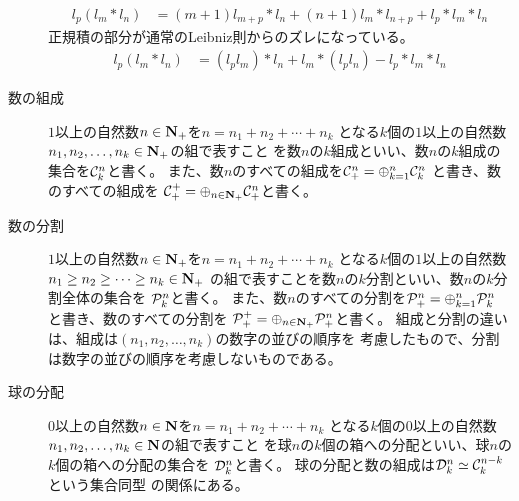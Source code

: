 \begin{description}
\begin{equation}
\begin{split}
			l_p(l_m*l_n) &= (m+1)l_{m+p}*l_n + (n+1)l_m*l_{n+p} + l_p*l_m*l_n
		\end{split}\end{equation} %
		正規積の部分が通常のLeibniz則からのズレになっている。
		\begin{equation*}\begin{split} %
			l_p(l_m*l_n) &= (l_pl_m)*l_n + l_m*(l_pl_n) - l_p*l_m*l_n
		\end{split}\end{equation*} %
		\item[数の組成] $1$以上の自然数$n\in{\ensuremath{\mathbf{N}}}_+$を$n=n_1+n_2+\cdots+n_k$
		となる$k$個の$1$以上の自然数$n_1,n_2,\dots,n_k\in{\ensuremath{\mathbf{N}}}_+$の組で表すこと
		を数$n$の$k$組成といい、数$n$の$k$組成の集合を${\mathcal{C}}_k^n$と書く。
		また、数$n$のすべての組成を${\mathcal{C}}_+^n=\oplus_{k=1}^n{\mathcal{C}}_k^n$
		と書き、数のすべての組成を
		${\mathcal{C}}_+^+=\oplus_{n\in{\ensuremath{\mathbf{N}}}_+}{\mathcal{C}}_+^n$と書く。
		\item[数の分割] $1$以上の自然数$n\in{\ensuremath{\mathbf{N}}}_+$を$n=n_1+n_2+\cdots+n_k$
		となる$k$個の$1$以上の自然数$n_1\ge n_2\ge\cdots\ge n_k\in{\ensuremath{\mathbf{N}}}_+$
		の組で表すことを数$n$の$k$分割といい、数$n$の$k$分割全体の集合を
		${\mathcal{P}}_k^n$と書く。
		また、数$n$のすべての分割を${\mathcal{P}}_+^n=\oplus_{k=1}^n{\mathcal{P}}_k^n$
		と書き、数のすべての分割を
		${\mathcal{P}}_+^+=\oplus_{n\in{\ensuremath{\mathbf{N}}}_+}{\mathcal{P}}_+^n$と書く。
		組成と分割の違いは、組成は$(n_1,n_2,\dots,n_k)$の数字の並びの順序を
		考慮したもので、分割は数字の並びの順序を考慮しないものである。
		\item[球の分配] $0$以上の自然数$n\in{\ensuremath{\mathbf{N}}}$を$n=n_1+n_2+\cdots+n_k$
		となる$k$個の$0$以上の自然数$n_1,n_2,\dots,n_k\in{\ensuremath{\mathbf{N}}}$の組で表すこと
		を球$n$の$k$個の箱への分配といい、球$n$の$k$個の箱への分配の集合を
		${\mathcal{D}}_k^n$と書く。
		球の分配と数の組成は${\mathcal{D}}_k^n\simeq{\mathcal{C}}_k^{n-k}$という集合同型
		の関係にある。
	\end{description} %


